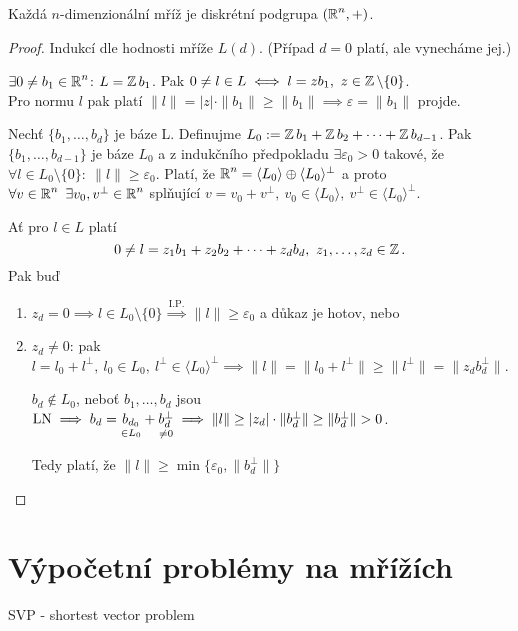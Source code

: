 \begin{claim}
Každá $n$-dimenzionální mříž je diskrétní podgrupa $(\operatorname{\mathbb{R}}^n,+)$.
\end{claim}

\begin{proof}
Indukcí dle hodnosti mříže $L(d)$. (Případ $d=0$ platí, ale vynecháme jej.)

 $\exists 0 \neq b_1 \in \operatorname{\mathbb{R}}^n$: $L=\operatorname{\mathbb{Z}} b_1$. Pak $0\neq l\in L\iff l=z b_1,\ z\in \operatorname{\mathbb{Z}}\setminus\{0\}$.\\
Pro normu $l$ pak platí $\|l\|=|z|\cdot\|b_1\|\geq\|b_1\|\implies \varepsilon=\|b_1\|$ projde.

 Nechť $\{b_1,\ldots,b_d\}$ je báze L. Definujme $L_0:=\operatorname{\mathbb{Z}} b_1+\operatorname{\mathbb{Z}} b_2 + \cdots +\operatorname{\mathbb{Z}} b_{d-1}$. 
Pak $\{b_1,\ldots,b_{d-1}\}$ je báze $L_0$ a z indukčního předpokladu $\exists \varepsilon_0>0$ takové, že $\forall l\in L_0\setminus\{0\}:\  \|l\|\geq \varepsilon_0$.
Platí, že $\operatorname{\mathbb{R}}^n=\langle L_0\rangle\oplus\langle L_0\rangle^\perp$ a proto $\forall v\in\operatorname{\mathbb{R}}^n\ \exists v_0, v^\perp\in\operatorname{\mathbb{R}}^n$ splňující $v=v_0+v^\perp,\ v_0\in\langle L_0\rangle,\ v^\perp\in\langle L_0 \rangle^\perp$. 

Ať pro $l \in L$ platí $$0\neq l = z_1 b_1+z_2 b_2+\cdots+z_d b_d,\ z_1,\ldots,z_d\in\operatorname{\mathbb{Z}}.$$Pak buď 

\begin{enumerate}
    \item $z_d=0\implies l\in L_0\setminus\{0\}\overset{\text{I.P.}}{\implies}\|l\|\geq \varepsilon_0$ a důkaz je hotov, nebo
    \item $z_d\neq0$: pak $ l=l_0+l^\perp, \ l_0 \in L_0, \ l^\perp \in \langle L_0 \rangle^\perp \implies\|l\| = \|l_0 + l^\perp \| \geq \|l^\perp\| = \|z_db_d^\perp\|$.
    
    $b_d\notin L_0$, neboť $b_1,\ldots,b_d$ jsou $\LN\implies b_d=\underset{\in L_0}{b_{d_0}}+\underset{\neq 0}{b_d^\perp} \implies \|l\|\geq|z_d|\cdot \|b_d^\perp\|\geq\|b_d^\perp\|>0$.
    
    Tedy platí, že $\|l\|\geq\min\{\varepsilon_0,\|b_d^\perp\|\}$
\end{enumerate}
\end{proof}

\section{\texorpdfstring{Výpočetní problémy na mřížích}{Vypocetni problemy na mrizich}}
SVP - shortest vector problem

